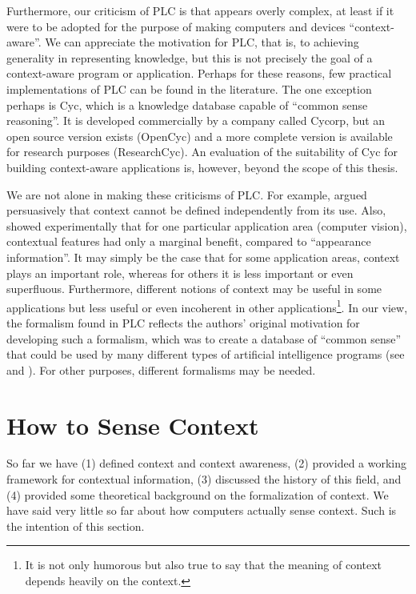 Furthermore, our criticism of PLC is that appears overly complex, at least if it were to be adopted for the purpose of making computers and devices ``context-aware''. We can appreciate the motivation for PLC, that is, to achieving generality in representing knowledge, but this is not precisely the goal of a context-aware program or application. Perhaps for these reasons, few practical implementations of PLC can be found in the literature. The one exception perhaps is Cyc, which is a knowledge database capable of ``common sense reasoning''. It is developed commercially by a company called Cycorp, but an open source version exists (OpenCyc) and a more complete version is available for research purposes (ResearchCyc). An evaluation of the suitability of Cyc for building context-aware applications is, however, beyond the scope of this thesis.

We are not alone in making these criticisms of PLC. For example, \cite{hirst1997context} argued persuasively that context cannot be defined independently from its use. Also, \cite{wolf2006critical} showed experimentally that for one particular application area (computer vision), contextual features had only a marginal benefit, compared to ``appearance information''. It may simply be the case that for some application areas, context plays an important role, whereas for others it is less important or even superfluous. Furthermore, different notions of context may be useful in some applications but less useful or even incoherent in other applications\footnote{It is not only humorous but also true to say that the meaning of context depends heavily on the context.}. In our view, the formalism found in PLC reflects the authors' original motivation for developing such a formalism, which was to create a database of ``common sense'' that could be used by many different types of artificial intelligence programs (see \cite{mccarthy1969some} and \cite{mccarthy1984some}). For other purposes, different formalisms may be needed.

%
%
\section{How to Sense Context}
\label{sec:how}
So far we have (1) defined context and context awareness, (2) provided a working framework for contextual information, (3) discussed the history of this field, and (4) provided some theoretical background on the formalization of context. We have said very little so far about how computers actually sense context. Such is the intention of this section.

